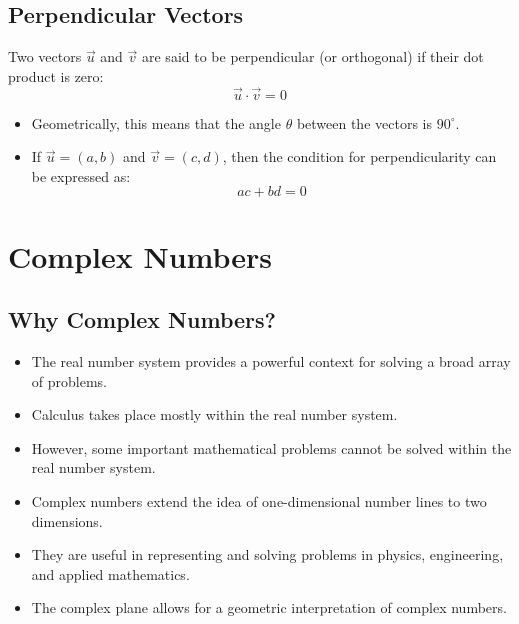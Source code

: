 \subsection{Perpendicular Vectors}
Two vectors \(\vec{u}\) and \(\vec{v}\) are said to be perpendicular (or orthogonal) if their dot product is zero:
\[ \vec{u} \cdot \vec{v} = 0 \]
\begin{itemize}
    \item Geometrically, this means that the angle \(\theta\) between the vectors is \(90^\circ\).
    \item If \(\vec{u} = (a, b)\) and \(\vec{v} = (c, d)\), then the condition for perpendicularity can be expressed as:
    \[ ac + bd = 0 \]
\end{itemize}

\section{Complex Numbers}
\subsection{Why Complex Numbers?}
\begin{itemize}
    \item The real number system provides a powerful context for solving a broad array of problems.
    \item Calculus takes place mostly within the real number system.
    \item However, some important mathematical problems cannot be solved within the real number system.
    \item Complex numbers extend the idea of one-dimensional number lines to two dimensions.
    \item They are useful in representing and solving problems in physics, engineering, and applied mathematics.
    \item The complex plane allows for a geometric interpretation of complex numbers.
\end{itemize}
